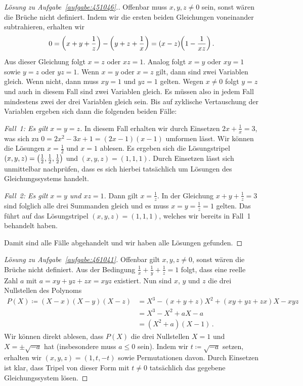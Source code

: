 \begin{proof}[Lösung zu Aufgabe~\ref{aufgabe:451046}.]
	Offenbar muss $x,y,z\neq 0$ sein, sonst wären die Brüche nicht definiert. Indem wir die ersten beiden Gleichungen voneinander subtrahieren, erhalten wir
	\begin{equation*}
		0=\parens*{x+y+\frac1z}-\parens*{y+z+\frac 1x}=(x-z)\parens*{1-\frac{1}{xz}}\,.
	\end{equation*}
	Aus dieser Gleichung folgt $x=z$ oder $xz=1$. Analog folgt $x=y$ oder $xy=1$ sowie $y=z$ oder $yz=1$. Wenn $x=y$ oder $x=z$ gilt, dann sind zwei Variablen gleich. Wenn nicht, dann muss $xy=1$ und $yz=1$ gelten. Wegen $x\neq 0$ folgt $y=z$ und auch in diesem Fall sind zwei Variablen gleich. Es müssen also in jedem Fall mindestens zwei der drei Variablen gleich sein. Bis auf zyklische Vertauschung der Variablen ergeben sich dann die folgenden beiden Fälle:
	
	\emph{Fall~1: Es gilt $x=y=z$.} In diesem Fall erhalten wir durch Einsetzen $2x+\frac 1x=3$, was sich zu $0=2x^2-3x+1=(2x-1)(x-1)$ umformen lässt. Wir können die Lösungen $x=\frac12$ und $x=1$ ablesen. Es ergeben sich die Lösungstripel $(x,y,z)=\parens[\big]{\frac12,\frac12,\frac12}$ und $(x,y,z)=(1,1,1)$. Durch Einsetzen lässt sich unmittelbar nachprüfen, dass es sich hierbei tatsächlich um Lösungen des Gleichungssystems handelt.
	
	\emph{Fall~2: Es gilt $x=y$ und $xz=1$.} Dann gilt $x=\frac 1z$. In der Gleichung $x+y+\frac 1z=3$ sind folglich alle drei Summanden gleich und es muss $x=y=\frac 1z=1$ gelten. Das führt auf das Lösungstripel $(x,y,z)=(1,1,1)$, welches wir bereits in Fall~1 behandelt haben.
	
	Damit sind alle Fälle abgehandelt und wir haben alle Lösungen gefunden.
\end{proof}
\begin{proof}[Lösung zu Aufgabe~\ref{aufgabe:461041}]
	Offenbar gilt $x,y,z\neq 0$, sonst wären die Brüche nicht definiert. Aus der Bedingung $\frac 1x+\frac 1y+\frac 1z=1$ folgt, dass eine reelle Zahl $a$ mit $a=xy+yz+zx=xyz$ existiert. Nun sind $x$, $y$ und $z$ die drei Nullstellen des Polynoms
	\begin{align*}
		P(X)\coloneqq (X-x)(X-y)(X-z)&=X^3-(x+y+z)X^2+(xy+yz+zx)X-xyz\\
		&=X^3-X^2+aX-a\\
		&=(X^2+a)(X-1)\,.
	\end{align*}
	Wir können direkt ablesen, dass $P(X)$ die drei Nullstellen $X=1$ und $X=\pm\sqrt{-a}$ hat (insbesondere muss $a\leqslant 0$ sein). Indem wir $t\coloneqq \sqrt{-a}$ setzen, erhalten wir $(x,y,z)=(1,t,-t)$ sowie Permutationen davon. Durch Einsetzen ist klar, dass Tripel von dieser Form mit $t\neq 0$ tatsächlich das gegebene Gleichungssystem lösen.
\end{proof}
